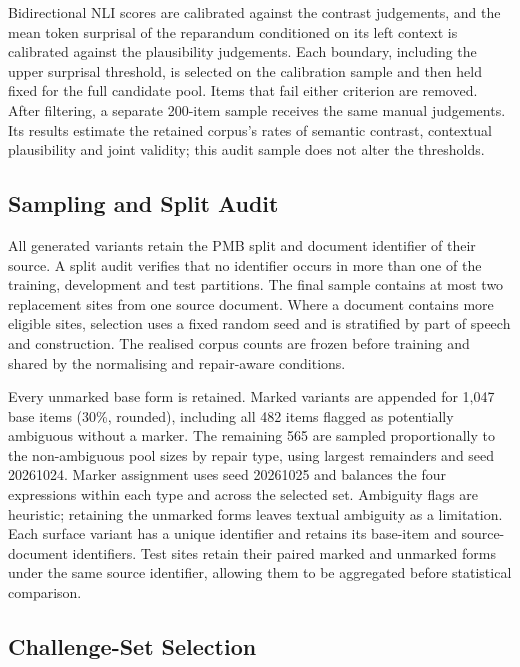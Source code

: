 Bidirectional NLI scores are calibrated against the contrast judgements, and
the mean token surprisal of the reparandum conditioned on its left context is
calibrated against the plausibility judgements. Each boundary, including the
upper surprisal threshold, is selected on the calibration sample and then held
fixed for the full candidate pool. Items that fail either criterion are
removed. After filtering, a separate 200-item sample receives the same manual
judgements. Its results estimate the retained corpus's rates of semantic
contrast, contextual plausibility and joint validity; this audit sample does
not alter the thresholds.

\subsection{Sampling and Split Audit}

All generated variants retain the PMB split and document identifier of their
source. A split audit verifies that no identifier occurs in more than one of
the training, development and test partitions. The final sample contains at
most two replacement sites from one source document. Where a document contains more
eligible sites, selection uses a fixed random seed and is stratified by part
of speech and construction. The realised corpus counts are frozen
before training and shared by the normalising and repair-aware conditions.

Every unmarked base form is retained. Marked variants are appended for
1,047 base items (30\%, rounded), including all 482 items flagged as
potentially ambiguous without a marker. The remaining 565 are sampled
proportionally to the non-ambiguous pool sizes by repair type, using largest
remainders and seed 20261024. Marker assignment uses seed 20261025 and
balances the four expressions within each type and across the selected set.
Ambiguity flags are heuristic; retaining the unmarked forms leaves textual
ambiguity as a limitation. Each surface variant has a unique identifier
and retains its base-item and source-document identifiers.
Test
sites retain their paired marked and unmarked forms under the same source
identifier, allowing them to be aggregated before statistical comparison.

\subsection{Challenge-Set Selection}

